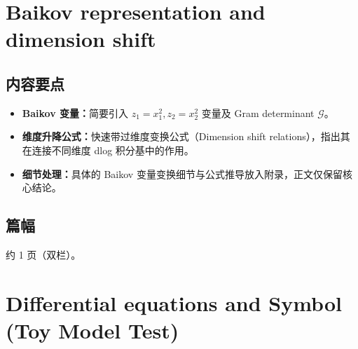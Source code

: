 \documentclass[UTF8,a4paper,11pt]{ctexart}
\begin{document}
\section{Baikov representation and dimension shift}
\subsection*{内容要点}
\begin{itemize}
  \item \textbf{Baikov 变量：}简要引入 $z_1=x_1^2, z_2=x_2^2$ 变量及 Gram determinant $\mathcal{G}$。
  \item \textbf{维度升降公式：}快速带过维度变换公式（Dimension shift relations），指出其在连接不同维度 dlog 积分基中的作用。
  \item \textbf{细节处理：}具体的 Baikov 变量变换细节与公式推导放入附录，正文仅保留核心结论。
\end{itemize}
\subsection*{篇幅}
约 1 页（双栏）。

\section{Differential equations and Symbol (Toy Model Test)}
\end{document}
